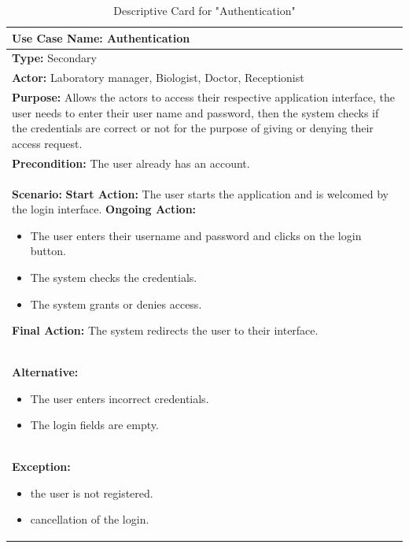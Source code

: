 \documentclass{article}
\begin{document}
\begin{table}[h]
\setlength{\tabcolsep}{10pt}
\renewcommand{\arraystretch}{1.5}
    \begin{tabular}{|p{\linewidth}|}
        \hline
        \textbf{Use Case Name:} Authentication\\ 
        \hline
        \textbf{Type:} Secondary\\ 
        \hline
        \textbf{Actor:} Laboratory manager, Biologist, Doctor, Receptionist\\ 
        \hline
        \textbf{Purpose:} Allows the actors to access their respective application interface, the user needs to enter their user name and password, then the system checks if the credentials are correct or not for the purpose of giving or denying their access request.\\ 
        \hline
        \textbf{Precondition:} The user already has an account.\\ 
        \hline
        \textbf{Scenario:}
        \vspace{0.2cm}
        \newline
        \vspace{0.2cm}
        \textbf{Start Action:} The user starts the application and is welcomed by the login interface.
        \newline
        \textbf{Ongoing Action:}  
        \begin{itemize}
            \item The user enters their username and password and clicks on the login button.
            \item The system checks the credentials.
            \item The system grants or denies access.
        \end{itemize}
        \textbf{Final Action:} The system redirects the user to their interface.\\
        \hline
        \textbf{Alternative:} 
        \begin{itemize}
            \item The user enters incorrect credentials.
            \item The login fields are empty.
        \end{itemize}\\ 
        \hline
        \textbf{Exception:}
        \begin{itemize}
            \item the user is not registered.
            \item cancellation of the login.
        \end{itemize}\\ 
        \hline
    \end{tabular}
    \caption{Descriptive Card for "Authentication"}
    \label{tab:my-table}
\end{table}
\end{document}
